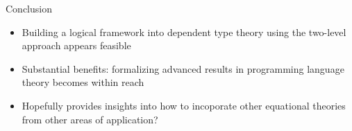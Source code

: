 \documentclass[usenames,dvipsnames]{beamer}
\begin{document}

\begin{frame}{Conclusion}
\begin{itemize}
\item Building a logical framework into dependent type theory using the two-level approach appears feasible
\item Substantial benefits: formalizing advanced results in programming language theory becomes within reach
\item Hopefully provides insights into how to incoporate other equational theories from other areas of application?
\end{itemize}
\end{frame}
\end{document}
